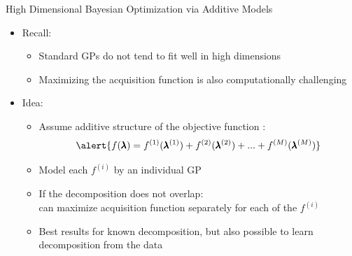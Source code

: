 \begin{frame}[c]{High Dimensional Bayesian Optimization via Additive Models}

\medskip
\begin{itemize}
    \item Recall:

    \begin{itemize}
        \item Standard GPs do not tend to fit well in high dimensions
        \item Maximizing the acquisition function is also computationally challenging
    \end{itemize}
\medskip
\pause
    \item Idea:
    \begin{itemize}
        \item Assume additive structure of the objective function :
        \begin{equation*}
            \alert{f(\conf)=f^{(1)}(\conf^{(1)})+f^{(2)}(\conf^{(2)})+...+f^{(M)}(\conf^{(M)})}
        \end{equation*}
        \item Model each $f^{(i)}$ by an individual GP
\medskip
\pause
        \item If the decomposition does not overlap:\\
        can maximize acquisition function separately for each of the $f^{(i)}$
\medskip
\pause
        \item Best results for known decomposition, but also possible to learn decomposition from the data
    \end{itemize}
\end{itemize}

\end{frame}

